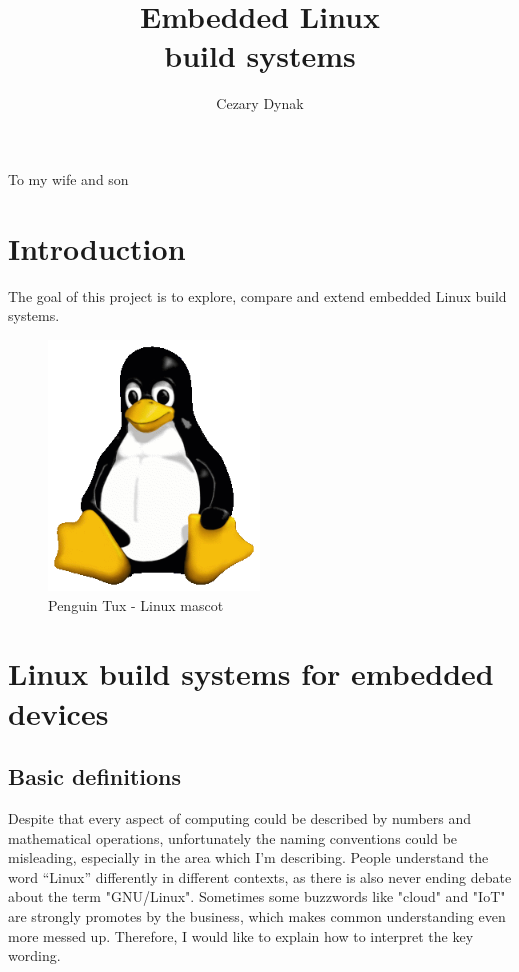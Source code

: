 \documentclass[printmode]{mgr}
\title{Embedded Linux \\ build systems}
\author{Cezary Dynak}
\begin{document}


\maketitle
\dedication{6cm}{To my wife and son}

\tableofcontents

\chapter*{Introduction}

The goal of this project is to explore, compare and extend embedded Linux build systems. \cite{web:bis-org-pl}
\begin{figure}[htbp]
  \centering
    \includegraphics[width=0.5\textwidth]{Tux.png}
  \caption{Penguin Tux - Linux mascot}
  \label{fig:panel-dotykowy}
\end{figure}



\chapter{Linux build systems for embedded devices}
\label{chapter:build systems}

\section{Basic definitions}

Despite that every aspect of computing could be described by numbers and mathematical operations, unfortunately the naming conventions could be misleading, especially in the area which I'm describing. People understand the word ``Linux'' differently in different contexts, as there is also never ending debate about the term "GNU/Linux". Sometimes some buzzwords like "cloud" and "IoT" are strongly promotes by the business, which makes common understanding even more messed up. Therefore, I would like to explain how to interpret the key wording.
\end{document}
